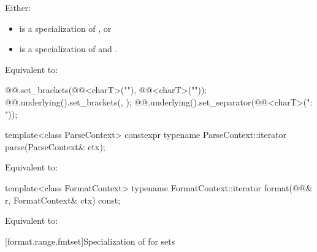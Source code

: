\begin{itemdescr}
\pnum
\mandates
Either:
\begin{itemize}
\item
{} is a specialization of , or
\item
{} is a specialization of  and
.
\end{itemize}

\pnum
\effects
Equivalent to:
\begin{codeblock}
@@.set_brackets(@@<charT>("{"), @@<charT>("}"));
@@.underlying().set_brackets({}, {});
@@.underlying().set_separator(@@<charT>(": "));
\end{codeblock}
\end{itemdescr}

%
\begin{itemdecl}
template<class ParseContext>
  constexpr typename ParseContext::iterator
    parse(ParseContext& ctx);
\end{itemdecl}

\begin{itemdescr}
\pnum
\effects
Equivalent to: 
\end{itemdescr}

%
\begin{itemdecl}
template<class FormatContext>
  typename FormatContext::iterator
    format(@@& r, FormatContext& ctx) const;
\end{itemdecl}

\begin{itemdescr}
\pnum
\effects
Equivalent to: 
\end{itemdescr}

[format.range.fmtset]{Specialization of  for sets}

